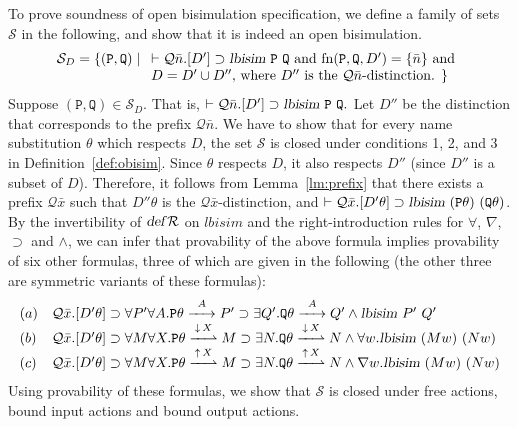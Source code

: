 \documentclass{acmtrans2m}
\def\Qscr{{\mathcal Q}}
\def\Sscr{{\mathcal S}}
\def\Ppi{{\mathtt P}}
\def\Qpi{{\mathtt Q}}
\newcommand{\lbisim}[2]{\hbox{\sl lbisim}~#1~#2}
\newcommand{\defR}{\hbox{\sl def\/{}}{\cal R}}
\newcommand{\inact}{\mathop{\downarrow}}
\newcommand{\oimp}{\supset}
\newcommand{\one  }[3]{#1\stackrel{#2}{-\!\!-\!\!\!\rightarrow    } #3}
\newcommand{\onep }[3]{#1\stackrel{#2}{-\!\!-\!\!\!\rightharpoonup} #3}
\newcommand{\outact}{\mathop{\uparrow}}
\newcommand{\fn}[1]{{\rm fn}(#1)}
\begin{document}
To prove soundness of open bisimulation specification, we define 
a family of sets $\Sscr$ in the following, and show that it is indeed an open
bisimulation.
$$
\Sscr_D = \{ (\Ppi, \Qpi) \mid  
\begin{array}[t]{l}
\mbox{$\vdash \Qscr \bar{n}. [D'] \oimp \lbisim \Ppi \Qpi$ and
      $\fn{\Ppi,\Qpi, D'} = \{\bar{n}\}$ and}\\
\mbox{$D = D' \cup D''$, where $D''$ is the $\Qscr\bar{n}$-distinction. $\}$} 
\end{array}
$$
Suppose $(\Ppi, \Qpi) \in \Sscr_D.$ That is, 
$
\vdash \Qscr \bar n. [D'] \oimp \lbisim \Ppi \Qpi.
$
Let $D''$ be the distinction that corresponds to the prefix $\Qscr \bar n.$
We have to show that for every name substitution $\theta$ which respects $D$,
the set $\Sscr$ is closed under conditions 1, 2, and 3 in Definition~\ref{def:obisim}.
Since $\theta$ respects $D$, it also respects $D''$ (since $D''$ is a subset of $D$).
Therefore, it follows from Lemma~\ref{lm:prefix} that there exists a prefix $\Qscr \bar x$
such that $D''\theta$ is the $\Qscr \bar x$-distinction, and 
$\vdash \Qscr \bar x. [D'\theta] \oimp \lbisim {(\Ppi\theta)} {(\Qpi\theta)}$.
By the invertibility of $\defR$ on $lbisim$ and the right-introduction rules 
for $\forall$, $\nabla$, $\oimp$ and $\land$, we can infer that provability of the
above formula implies provability of six other formulas, three of which
are given in the following (the other three are symmetric variants of these formulas):
$$
\begin{array}{ll}
(a) & \Qscr \bar x. [D'\theta] \oimp \forall P'\forall A. \one{\Ppi\theta}{A}{P'} 
\oimp \exists Q'. \one{\Qpi\theta}{A}{Q'} \land \lbisim {P'} {Q'} \\
(b) & \Qscr \bar x. [D'\theta] \oimp \forall M\forall X. \onep{\Ppi\theta}{\inact X}{M} 
\oimp \exists N. \onep{\Qpi\theta}{\inact X}{N} \land \forall w. \lbisim {(M w)} {(N w)} \\
(c) & \Qscr \bar x. [D'\theta] \oimp \forall M\forall X. \onep{\Ppi\theta}{\outact X}{M} 
\oimp \exists N. \onep{\Qpi\theta}{\outact X}{N} \land \nabla w. \lbisim {(M w)} {(N w)} \\
\end{array}
$$
Using provability of these formulas, we show that $\Sscr$ is closed under
free actions, bound input actions and bound output actions.
\end{document}
